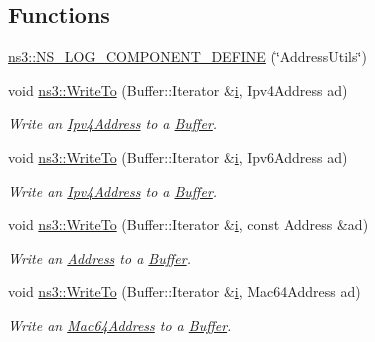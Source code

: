 \subsection*{Functions}
\begin{DoxyCompactItemize}
\item 
\hyperlink{namespacens3_a42e91353417bf407d15aafaf9cd4d091}{ns3\+::\+N\+S\+\_\+\+L\+O\+G\+\_\+\+C\+O\+M\+P\+O\+N\+E\+N\+T\+\_\+\+D\+E\+F\+I\+NE} (\char`\"{}Address\+Utils\char`\"{})
\item 
void \hyperlink{namespacens3_abe3cb0173e87a3f7e2e414358c0a08bf}{ns3\+::\+Write\+To} (Buffer\+::\+Iterator \&\hyperlink{lte__uplink__power__control_8m_a6f6ccfcf58b31cb6412107d9d5281426}{i}, Ipv4\+Address ad)
\begin{DoxyCompactList}\small\item\em Write an \hyperlink{classns3_1_1Ipv4Address}{Ipv4\+Address} to a \hyperlink{classns3_1_1Buffer}{Buffer}. \end{DoxyCompactList}\item 
void \hyperlink{namespacens3_a8cb18ca2c56fad6c22d74594cb3b9d84}{ns3\+::\+Write\+To} (Buffer\+::\+Iterator \&\hyperlink{lte__uplink__power__control_8m_a6f6ccfcf58b31cb6412107d9d5281426}{i}, Ipv6\+Address ad)
\begin{DoxyCompactList}\small\item\em Write an \hyperlink{classns3_1_1Ipv4Address}{Ipv4\+Address} to a \hyperlink{classns3_1_1Buffer}{Buffer}. \end{DoxyCompactList}\item 
void \hyperlink{namespacens3_ab9c4ee718cab1f7e5248027d30b94c4d}{ns3\+::\+Write\+To} (Buffer\+::\+Iterator \&\hyperlink{lte__uplink__power__control_8m_a6f6ccfcf58b31cb6412107d9d5281426}{i}, const Address \&ad)
\begin{DoxyCompactList}\small\item\em Write an \hyperlink{classns3_1_1Address}{Address} to a \hyperlink{classns3_1_1Buffer}{Buffer}. \end{DoxyCompactList}\item 
void \hyperlink{namespacens3_ab92180aa127d2dcca1c8f92b39771335}{ns3\+::\+Write\+To} (Buffer\+::\+Iterator \&\hyperlink{lte__uplink__power__control_8m_a6f6ccfcf58b31cb6412107d9d5281426}{i}, Mac64\+Address ad)
\begin{DoxyCompactList}\small\item\em Write an \hyperlink{classns3_1_1Mac64Address}{Mac64\+Address} to a \hyperlink{classns3_1_1Buffer}{Buffer}. \end{DoxyCompactList}\item 

\end{DoxyCompactItemize}
